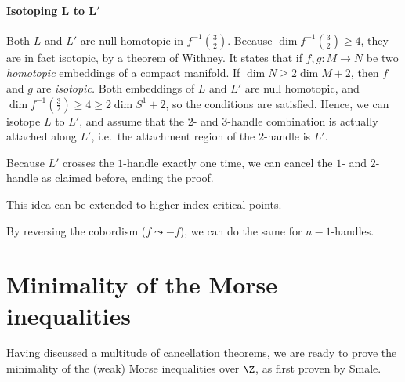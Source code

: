 \begin{myproof}
    \paragraph{Isotoping $\bm{L}$ to $\bm{L'}$}
    Both $L$ and $L'$ are null-homotopic in  $f^{-1}(\frac{3}{2})$.
    Because $\dim f^{-1}(\frac{3}{2}) \ge 4$, they are in fact isotopic, by a theorem of Withney.
    It states that if $f, g: M \to N$ be two \emph{homotopic} embeddings of a compact manifold. If $\dim N \ge  2 \dim M + 2$, then $f$ and  $g$ are \emph{isotopic.}
    Both embeddings of $L$ and  $L'$ are null homotopic, and  $\dim f^{-1}(\frac{3}{2}) \ge 4 \ge  2 \dim S^{1} +  2$, so the conditions are satisfied.
    Hence, we can isotope $L$ to $L'$, and assume that the $2$- and  $3$-handle combination is actually attached along $L'$, i.e.\ the attachment region of the $2$-handle is $L'$.

    Because $L'$ crosses the  $1$-handle exactly one time, we can cancel the $1$- and $2$-handle as claimed before, ending the proof.
\end{myproof}
\begin{remark}
    This idea can be extended to higher index critical points.
\end{remark}
\begin{remark}
    By reversing the cobordism ($f \leadsto -f$), we can do the same for $n-1$-handles.
\end{remark}

\section{Minimality of the Morse inequalities}
\label{sec:minimality}

Having discussed a multitude of cancellation theorems, we are ready to prove the minimality of the (weak) Morse inequalities over $\Z$, as first proven by Smale.

